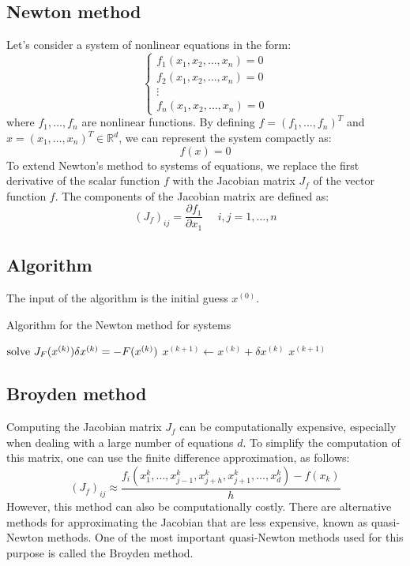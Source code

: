 \documentclass[12pt, a4paper]{report}
\begin{document}
    \subsection{Newton method}
    Let's consider a system of nonlinear equations in the form:
    \[\begin{cases}
        f_1(x_1,x_2,\dots,x_n)=0 \\
        f_2(x_1,x_2,\dots,x_n)=0 \\
        \vdots                   \\
        f_n(x_1,x_2,\dots,x_n)=0 
    \end{cases}\]
    where $f_1,\dots,f_n$ are nonlinear functions. 
    By defining $f=(f_1,\dots,f_n)^T$ and $x=(x_1,\dots,x_n)^T \in \mathbb{R}^d$, we can represent the system compactly as:
    \[f(x)=0\]
    To extend Newton's method to systems of equations, we replace the first derivative of the scalar function $f$ with the Jacobian matrix $J_f$ of the vector function $f$.
    The components of the Jacobian matrix are defined as:
    \[(J_f)_{ij}=\dfrac{\partial f_1}{\partial x_1} \:\:\:\:\:\: i,j=1,\dots,n\]

    \subsection{Algorithm}
    The input of the algorithm is the initial guess $x^{(0)}$. 
    \begin{algorithm}[H]
        \caption{Algorithm for the Newton method for systems}
            \begin{algorithmic}[1]
                    \State $\textnormal{solve  } J_{F}(x^{(k)})\delta x^{(k)}=-F(x^{(k)})$
                    \State $x^{(k+1)} \leftarrow x^{(k)}+\delta x^{(k)}$
                        \State \Return $x^{(k+1)}$
                    \EndIf
                \EndFor
            \end{algorithmic}
    \end{algorithm}

    \subsection{Broyden method}
    Computing the Jacobian matrix $J_f$ can be computationally expensive, especially when dealing with a large number of equations $d$. 
    To simplify the computation of this matrix, one can use the finite difference approximation, as follows:
    \[(J_f)_{ij} \approx \dfrac{f_i(x_1^{k},\dots,x_{j-1}^{k},x_{j+h}^{k},x_{j+1}^{k},\dots,x_{d}^{k})-f(x_{k})}{h}\]
    However, this method can also be computationally costly.
    There are alternative methods for approximating the Jacobian that are less expensive, known as quasi-Newton methods. 
    One of the most important quasi-Newton methods used for this purpose is called the Broyden method.
\end{document}
